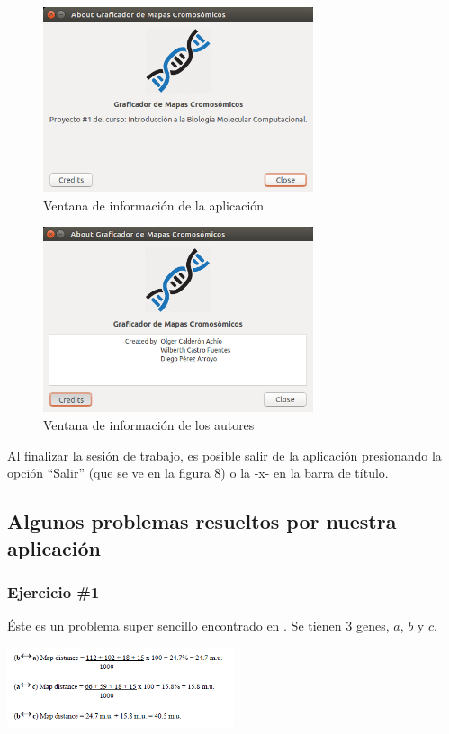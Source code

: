 \documentclass{article}
\begin{document}
	\begin{figure}[h!]
		\centering
			\includegraphics[width=300px, keepaspectratio=false]{report8}
				\caption{Ventana de información de la aplicación}
	\end{figure}
	
	\begin{figure}[h!]
		\centering
			\includegraphics[width=300px, keepaspectratio=false]{report9}
				\caption{Ventana de información de los autores}
	\end{figure}
	
	Al finalizar la sesión de trabajo, es posible salir de la aplicación presionando la opción ``Salir'' (que se ve en la figura 8) o la -x- en la barra de título.
	
	\subsection{Algunos problemas resueltos por nuestra aplicación}
	
	\subsubsection{Ejercicio \#1}
	
	Éste es un problema super sencillo encontrado en \cite{carrinnes2003handbook}. Se tienen 3 genes, $a$, $b$ y $c$.
	
	\begin{center}
		\includegraphics[width=0.5\textwidth]{images/e_1.png}
	\end{center}
	
\end{document}
